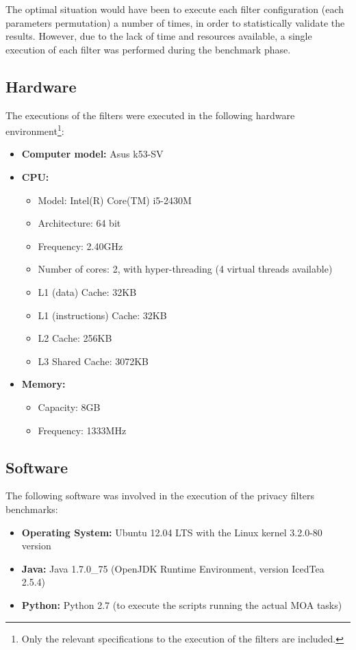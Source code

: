 The optimal situation would have been to execute each filter configuration (each parameters permutation) a number of times, in order to statistically validate the results. However, due to the lack of time and resources available, a single execution of each filter was performed during the benchmark phase.

\subsection{Hardware}
\label{Benchmarking:Experimental:Hardware}

The executions of the filters were executed in the following hardware environment\footnote{Only the relevant specifications to the execution of the filters are included.}:

\begin{itemize}
\item \textbf{Computer model:} Asus k53-SV
\item \textbf{CPU:}
	\begin{itemize}
		\item Model: Intel(R) Core(TM) i5-2430M
		\item Architecture: 64 bit
		\item Frequency: 2.40GHz
		\item Number of cores: 2, with hyper-threading (4 virtual threads available)
		\item L1 (data) Cache: 32KB
		\item L1 (instructions) Cache: 32KB
		\item L2 Cache: 256KB
		\item L3 Shared Cache: 3072KB
	\end{itemize}
\item \textbf{Memory:}
	\begin{itemize}
		\item Capacity: 8GB
		\item Frequency: 1333MHz
	\end{itemize}
\end{itemize}

\subsection{Software}
\label{Benchmarking:Experimental:Software}

The following software was involved in the execution of the privacy filters benchmarks:

\begin{itemize}
\item \textbf{Operating System:} Ubuntu 12.04 LTS with the Linux kernel 3.2.0-80 version
\item \textbf{Java:} Java 1.7.0\_75 (OpenJDK Runtime Environment, version IcedTea 2.5.4)
\item \textbf{Python:} Python 2.7 (to execute the scripts running the actual MOA tasks)
\end{itemize}